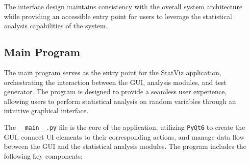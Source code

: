 \documentclass{article}
\begin{document}
The interface design maintains consistency with the overall system architecture while providing an accessible entry point for users to leverage the statistical analysis capabilities of the system.

\subsection{Main Program}

The main program serves as the entry point for the StatViz application, orchestrating the interaction between the GUI, analysis modules, and test generator. The program is designed to provide a seamless user experience, allowing users to perform statistical analysis on random variables through an intuitive graphical interface.

The \texttt{\_\_main\_\_.py} file is the core of the application, utilizing \texttt{PyQt6} to create the GUI, connect UI elements to their corresponding actions, and manage data flow between the GUI and the statistical analysis modules. The program includes the following key components:
\end{document}
